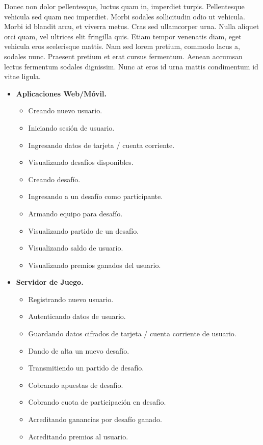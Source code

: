 \documentclass[a4paper, 10pt, twoside]{article}
\begin{document}
Donec non dolor pellentesque, luctus quam in, imperdiet turpis. Pellentesque vehicula sed quam nec imperdiet. Morbi sodales sollicitudin odio ut vehicula. Morbi id blandit arcu, et viverra metus. Cras sed ullamcorper urna. Nulla aliquet orci quam, vel ultrices elit fringilla quis. Etiam tempor venenatis diam, eget vehicula eros scelerisque mattis. Nam sed lorem pretium, commodo lacus a, sodales nunc. Praesent pretium et erat cursus fermentum. Aenean accumsan lectus fermentum sodales dignissim. Nunc at eros id urna mattis condimentum id vitae ligula.

\begin{itemize}

  \item \textbf{Aplicaciones Web/Móvil.}
  \begin{itemize}
    \item Creando nuevo usuario.
    \item Iniciando sesión de usuario.
    \item Ingresando datos de tarjeta / cuenta corriente.
    \item Visualizando desafíos disponibles.
    \item Creando desafío.
    \item Ingresando a un desafío como participante.
    \item Armando equipo para desafío.
    \item Visualizando partido de un desafío.
    \item Visualizando saldo de usuario.
    \item Visualizando premios ganados del usuario.
  \end{itemize}

  \item \textbf{Servidor de Juego.}
  \begin{itemize}
    \item Registrando nuevo usuario.
    \item Autenticando datos de usuario.
    \item Guardando datos cifrados de tarjeta / cuenta corriente de usuario.
    \item Dando de alta un nuevo desafío.
    \item Transmitiendo un partido de desafío.
    \item Cobrando apuestas de desafío.
    \item Cobrando cuota de participación en desafío.
    \item Acreditando ganancias por desafío ganado.
    \item Acreditando premios al usuario.
  \end{itemize}


\end{itemize}
\end{document}
